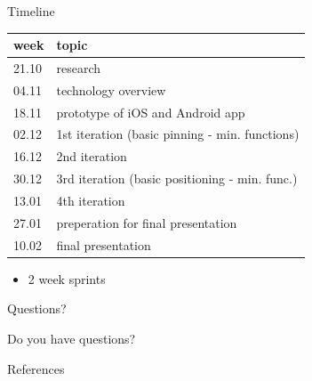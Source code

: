 \documentclass[11pt]{beamer}
\begin{document}
\begin{frame}{Timeline}

    \begin{center}
    
    	\begin{tabular}{ l | l }
    	
    		\textbf{week}	&	\textbf{topic} \\
            \midrule
            21.10			&	research \\
            04.11			&	technology overview \\
            18.11			&	prototype of iOS and Android app \\
            02.12			&	1st iteration (basic pinning - min. functions) \\
            16.12			&	2nd iteration \\
            30.12			&	3rd iteration (basic positioning - min. func.) \\
            13.01			&	4th iteration \\
            27.01			&	preperation for final presentation \\
            10.02			&	final presentation \\
        \end{tabular}

    \end{center}

	\begin{itemize}
		\item 2 week sprints
	\end{itemize}

\end{frame}

\begin{frame}{Questions?}

	\begin{center}
	
		{\Huge Do you have questions?}
        
    \end{center}

\end{frame}

\begin{frame}[allowframebreaks]{References}

	\nocite{*}
	{\tiny }

\end{frame}
\end{document}
